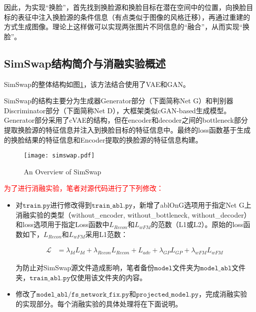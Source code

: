 \documentclass[a4paper]{article}
\renewcommand{\tt}[1]{\mathtt{#1}}
\begin{document}
因此，为实现“换脸”，首先找到换脸源和换脸目标在潜在空间中的位置，向换脸目标的表征中注入换脸源的条件信息（有点类似于图像的风格迁移），再通过重建的方式生成图像。理论上这样做可以实现两张图片不同信息的“融合”，从而实现“换脸”。

\subsection{SimSwap结构简介与消融实验概述}

SimSwap\cite{simswap}的整体结构如图\ref{fig2}，该方法结合使用了VAE和GAN。

SimSwap的结构主要分为生成器Generator部分（下面简称Net G）和判别器Discriminator部分（下面简称Net D），大框架类似cGAN-based生成模型。Generator部分采用了cVAE的结构，但在encoder和decoder之间的bottleneck部分提取换脸源的特征信息并注入到换脸目标的特征信息中。最终的loss函数基于生成的换脸结果的特征信息和Encoder提取的换脸源的特征信息构建。
 
\begin{figure}[htb]
  \centering
  \texttt{[image: simswap.pdf]}
  \caption{An Overview of SimSwap \cite{simswap}}
  \label{fig2}
\end{figure}

\vspace{1em}
\textcolor{red}{为了进行消融实验，笔者对源代码进行了下列修改：}

\vspace{-0.5em}
\begin{itemize}
    \item 对$\tt{train.py}$进行修改得到$\tt{train\_abl.py}$，新增了ablOnG选项用于指定Net G上消融实验的类型（without\_encoder, without\_bottleneck, without\_decoder）和loss选项用于指定Loss函数中$L_{Recon}$和$L_{wFM}$的范数（L1或L2）。原始的loss函数如下，$L_{Recon}$和$L_{wFM}$采用L1范数：
    
    \vspace{-2.5em}
    \begin{align*}
        \mathcal{L}&=\lambda_{Id}L_{Id} + \lambda_{Recon}L_{Recon} + L_{adv} + \lambda_{GP}L_{GP} + \lambda_{wFM}L_{wFM}
    \end{align*}
    
    \vspace{-1.2em}
    为防止对SimSwap源文件造成影响，笔者备份$\tt{model}$文件夹为$\tt{model\_abl}$文件夹，$\tt{train\_abl.py}$仅使用该文件夹的内容。
    \item 修改了$\tt{model\_abl/fs\_network\_fix.py}$和$\tt{projected\_model.py}$，完成消融实验的实现部分。每个消融实验的具体处理将在下面说明。
\end{itemize}
\end{document}

